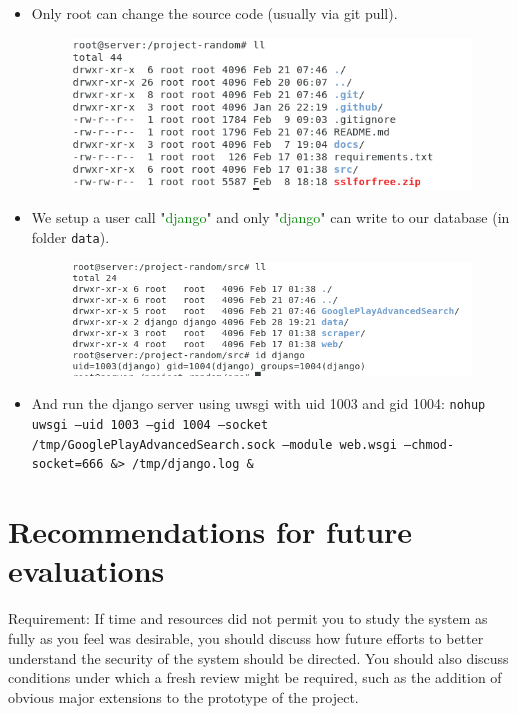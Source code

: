 \documentclass[12pt, a4paper]{article}
\newcommand{\code}[1]{\texttt{#1}}
\begin{document}
\begin{itemize}
    \item Only root can change the source code (usually via git pull).
    \begin{figure}[H]
    \centering
    \includegraphics[width=\textwidth, frame]{sourcecodeper.png}
    \end{figure}
    \item We setup a user call "\textcolor{green}{django}" and only "\textcolor{green}{django}" can write to our database (in folder \code{data}).
    \begin{figure}[H]
    \centering
    \includegraphics[width=\textwidth, frame]{databaseper.png}
    \end{figure}
    \item And run the django server using uwsgi with uid 1003 and gid 1004: \code{nohup uwsgi --uid 1003 --gid 1004 --socket /tmp/GooglePlayAdvancedSearch.sock --module web.wsgi --chmod-socket=666 \&> /tmp/django.log \&}
\end{itemize}










\section{Recommendations for future evaluations}

Requirement: If time and resources did not permit you to study the system as fully as you feel was desirable, you should discuss how future efforts to better understand the security of the system should be directed. You should also discuss conditions under which a fresh review might be required, such as the addition of obvious major extensions to the prototype of the project. 
\end{document}
